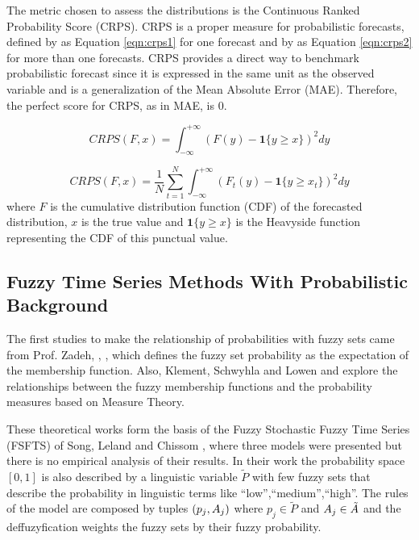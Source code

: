 The metric chosen to assess the distributions is the Continuous Ranked Probability Score (CRPS). CRPS is a proper measure for probabilistic forecasts, defined by  \cite{Gneiting2007b} as Equation \eqref{eqn:crps1} for one forecast and by \cite{Gneiting2007b} as Equation \eqref{eqn:crps2} for more than one forecasts. CRPS provides a direct way to benchmark probabilistic forecast since it is expressed in the same unit as the observed variable and is a generalization of the Mean Absolute Error (MAE). Therefore, the perfect score for CRPS, as in MAE, is 0.

\begin{equation}
CRPS(F,x) = \int_{-\infty}^{+\infty} (F(y) - \mathbf{1}\{y \geq x\})^2  dy
\label{eqn:crps1}
\end{equation}

\begin{equation}
CRPS(F,x) = \frac{1}{N} \sum_{t=1}^{N} \int_{-\infty}^{+\infty} (F_t(y) - \mathbf{1}\{y \geq x_t\})^2  dy
\label{eqn:crps2}
\end{equation}
where $F$ is the cumulative distribution function (CDF) of the forecasted distribution, $x$ is the true value and $\mathbf{1}\{y \geq x\}$ is the Heavyside function representing the CDF of this punctual value.

%
\subsection{Fuzzy Time Series Methods With Probabilistic Background}

The first studies to make the relationship of probabilities with fuzzy sets came from Prof. Zadeh, \cite{Zadeh1968}, \cite{Zadeh1984}, which defines the fuzzy set probability as the expectation of the membership function. Also, Klement, Schwyhla and Lowen \cite{ErichPeterKLEMENT1981} and \cite{Dubois1989} explore the relationships between the fuzzy membership functions and the probability measures based on Measure Theory. 

These theoretical works form the basis of the Fuzzy Stochastic Fuzzy Time Series (FSFTS) of Song, Leland and Chissom \cite{Song1997}, where three models were presented but there is no empirical analysis of their results. In their work the probability space $[0,1]$ is also described by a linguistic variable $\tilde{P}$ with few fuzzy sets that describe the probability in linguistic terms like ``low'',``medium'',``high''. The rules of the model are composed by tuples $(p_j,A_j)$ where $p_j \in \tilde{P}$ and $A_j \in \tilde{A}$ and the deffuzyfication weights the fuzzy sets by their fuzzy probability.

